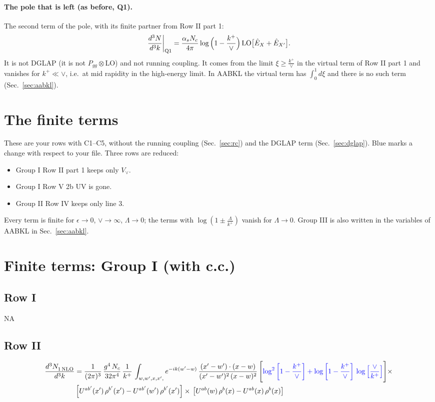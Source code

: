 \documentclass[9pt]{article}
\newcommand{\new}[1]{{\color{blue}#1}}
\numberwithin{equation}{section}
\begin{document}
\paragraph{The pole that is left (as before, Q1).} The second term of the pole, with its finite partner from Row II part 1:
\begin{equation}
\frac{d^3N}{d^3k}\bigg|_{\rm Q1}=\frac{\alpha_sN_c}{4\pi}\log\Big(1-\frac{k^+}{\vee}\Big)\,{\rm LO}\big[\hat E_X+\hat E_{X'}\big].
\label{eq:q1}
\end{equation}
It is not DGLAP (it is not $P_{gg}\otimes$LO) and not running coupling. It comes from the limit $\xi\ge\frac{k^+}{\vee}$ in the virtual term of Row II part 1 and vanishes for $k^+\ll\vee$, i.e.\ at mid rapidity in the high-energy limit. In AABKL the virtual term has $\int_0^1d\xi$ and there is no such term (Sec.~\ref{sec:aabkl}).



\section{The finite terms}\label{sec:fin}
These are your rows with C1--C5, without the running coupling (Sec.~\ref{sec:rc}) and the DGLAP term (Sec.~\ref{sec:dglap}). Blue marks a change with respect to your file. Three rows are reduced:
\begin{itemize}
\item Group I Row II part 1 keeps only $V_\vee$.
\item Group I Row V 2b UV is gone.
\item Group II Row IV keeps only line 3.
\end{itemize}
Every term is finite for $\epsilon\to0$, $\vee\to\infty$, $\Lambda\to0$; the terms with $\log(1\pm\frac{\Lambda}{k^+})$ vanish for $\Lambda\to0$. Group III is also written in the variables of AABKL in Sec.~\ref{sec:aabkl}.
\section{Finite terms: Group I (with c.c.)}
\subsection{Row I}
\textsc{NA}
\subsection{Row II}
\begin{align}
     \frac{d^{3}N_{1\,\rm NLO}^{\rm}}{d^{3}k} &  = \frac{1}{(2\pi)^{3}}\, \frac{g^{4}\,N_{c}}{32\pi^{4}}\,\frac{1}{k^{+}}\, \int_{w, w',x,x',} e^{-ik(w^\prime-w)}\, \frac{(x'-w')\cdot (x-w)}{(x'-w')^{2}\, (x-w)^{2}}\, \Bigg[\new{\log^{2}{\left[1-\frac{k^{+}}{\vee}\right]}+\log{\left[1-\frac{k^{+}}{\vee}\right]}\,\log{\left[\frac{\vee}{k^{+}}\right]}}\Bigg]\times\notag \\ & \left[U^{ab'}(x')\,\rho^{b'}(x') - U^{ab'}(w')\,\rho^{b'}(x')\right]\times\,\left[U^{ab}(w)\,\rho^{b}(x) - U^{ab}(x)\,\rho^{b}(x)\right]
\end{align}
\end{document}
